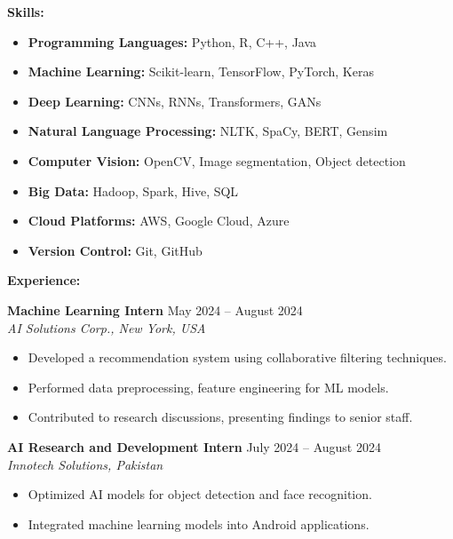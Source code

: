 \documentclass[a4paper,12pt]{article}
\begin{document}
\vspace{1em}
\noindent
\textbf{Skills:}
\begin{itemize}[leftmargin=*]
    \item \textbf{Programming Languages:} Python, R, C++, Java
    \item \textbf{Machine Learning:} Scikit-learn, TensorFlow, PyTorch, Keras
    \item \textbf{Deep Learning:} CNNs, RNNs, Transformers, GANs
    \item \textbf{Natural Language Processing:} NLTK, SpaCy, BERT, Gensim
    \item \textbf{Computer Vision:} OpenCV, Image segmentation, Object detection
    \item \textbf{Big Data:} Hadoop, Spark, Hive, SQL
    \item \textbf{Cloud Platforms:} AWS, Google Cloud, Azure
    \item \textbf{Version Control:} Git, GitHub
\end{itemize}

\vspace{1em}
\noindent
\textbf{Experience:}

\textbf{Machine Learning Intern} \hfill May 2024 -- August 2024 \\
\textit{AI Solutions Corp., New York, USA}
\begin{itemize}[leftmargin=*]
    \item Developed a recommendation system using collaborative filtering techniques.
    \item Performed data preprocessing, feature engineering for ML models.
    \item Contributed to research discussions, presenting findings to senior staff.
\end{itemize}

\vspace{1em}
\noindent
\textbf{AI Research and Development Intern} \hfill July 2024 -- August 2024 \\
\textit{Innotech Solutions, Pakistan}
\begin{itemize}[leftmargin=*]
    \item Optimized AI models for object detection and face recognition.
    \item Integrated machine learning models into Android applications.
\end{itemize}
\end{document}
